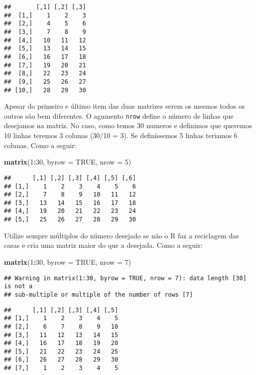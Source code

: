 \documentclass[]{book}
\newenvironment{Shaded}{\begin{snugshade}}{\end{snugshade}}
\newcommand{\DataTypeTok}[1]{\textcolor[rgb]{0.13,0.29,0.53}{#1}}
\newcommand{\DecValTok}[1]{\textcolor[rgb]{0.00,0.00,0.81}{#1}}
\newcommand{\KeywordTok}[1]{\textcolor[rgb]{0.13,0.29,0.53}{\textbf{#1}}}
\newcommand{\NormalTok}[1]{#1}
\newcommand{\OperatorTok}[1]{\textcolor[rgb]{0.81,0.36,0.00}{\textbf{#1}}}
\newcommand{\OtherTok}[1]{\textcolor[rgb]{0.56,0.35,0.01}{#1}}
\theoremstyle{definition}
\theoremstyle{definition}
\theoremstyle{definition}
\theoremstyle{remark}
\begin{document}
\begin{verbatim}
##       [,1] [,2] [,3]
##  [1,]    1    2    3
##  [2,]    4    5    6
##  [3,]    7    8    9
##  [4,]   10   11   12
##  [5,]   13   14   15
##  [6,]   16   17   18
##  [7,]   19   20   21
##  [8,]   22   23   24
##  [9,]   25   26   27
## [10,]   28   29   30
\end{verbatim}

Apesar do primeiro e último item das duas matrizes serem os mesmos todos os outros são bem diferentes. O agumento \texttt{nrow} define o número de linhas que desejamos na matriz. No caso, como temos 30 numeros e definimos que queremos 10 linhas teremos 3 colunas (30/10 = 3). Se definíssemos 5 linhas teriamos 6 colunas. Como a seguir:

\begin{Shaded}
\begin{Highlighting}[]
\KeywordTok{matrix}\NormalTok{(}\DecValTok{1}\OperatorTok{:}\DecValTok{30}\NormalTok{, }\DataTypeTok{byrow =} \OtherTok{TRUE}\NormalTok{, }\DataTypeTok{nrow =} \DecValTok{5}\NormalTok{)}
\end{Highlighting}
\end{Shaded}

\begin{verbatim}
##      [,1] [,2] [,3] [,4] [,5] [,6]
## [1,]    1    2    3    4    5    6
## [2,]    7    8    9   10   11   12
## [3,]   13   14   15   16   17   18
## [4,]   19   20   21   22   23   24
## [5,]   25   26   27   28   29   30
\end{verbatim}

Utilize sempre múltiplos do número desejado se não o R faz a reciclagem das casas e cria uma matriz maior do que a desejada. Como a seguir:

\begin{Shaded}
\begin{Highlighting}[]
\KeywordTok{matrix}\NormalTok{(}\DecValTok{1}\OperatorTok{:}\DecValTok{30}\NormalTok{, }\DataTypeTok{byrow =} \OtherTok{TRUE}\NormalTok{, }\DataTypeTok{nrow =} \DecValTok{7}\NormalTok{)}
\end{Highlighting}
\end{Shaded}

\begin{verbatim}
## Warning in matrix(1:30, byrow = TRUE, nrow = 7): data length [30] is not a
## sub-multiple or multiple of the number of rows [7]
\end{verbatim}

\begin{verbatim}
##      [,1] [,2] [,3] [,4] [,5]
## [1,]    1    2    3    4    5
## [2,]    6    7    8    9   10
## [3,]   11   12   13   14   15
## [4,]   16   17   18   19   20
## [5,]   21   22   23   24   25
## [6,]   26   27   28   29   30
## [7,]    1    2    3    4    5
\end{verbatim}
\end{document}
